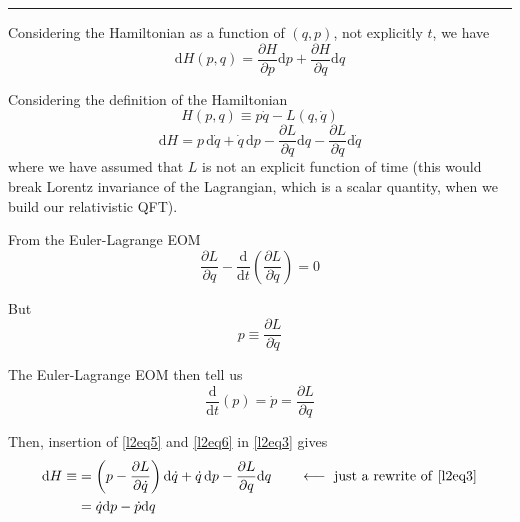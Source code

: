 \documentclass{article}
\begin{document}
\noindent\rule{\textwidth}{.5pt}


\noindent Considering the Hamiltonian as a function of $(q, p)$, not explicitly $t$, we have
\begin{equation}
    \mathrm{d} H (p, q) = \dfrac{ \partial H }{ \partial p } \mathrm{d} p + \dfrac{ \partial H }{ \partial q } \mathrm{d} q \label{l2eq1} %
\end{equation}

\noindent Considering the definition of the Hamiltonian
\begin{equation}
    H (p, q) \equiv p \dot{q} - L (q, \dot{q}) %
\end{equation}
\begin{equation}
    \mathrm{d} H = p \,\mathrm{d} \dot{q} + \dot{q} \,\mathrm{d} p - \dfrac{ \partial L }{ \partial q } \mathrm{d} q - \dfrac{ \partial L }{ \partial \dot{q} } \mathrm{d} \dot{q} \label{l2eq3} %
\end{equation}
where we have assumed that $L$ is not an explicit function of time (this would break Lorentz invariance of the Lagrangian, which is a scalar quantity, when we build our relativistic QFT).

\noindent From the Euler-Lagrange EOM
\begin{equation}
    \dfrac{ \partial L }{ \partial q } - \dfrac{\mathrm{d}}{ \mathrm{d} t } \left( \dfrac{ \partial L }{ \partial \dot{q} } \right) = 0 %
\end{equation}

\noindent But
\begin{equation}
    p \equiv \dfrac{ \partial L }{ \partial \dot{q} } \label{l2eq5} %
\end{equation}

\noindent The Euler-Lagrange EOM then tell us
\begin{equation}
    \dfrac{\mathrm{d}}{ \mathrm{d} t } (p) = \dot{p} = \dfrac{ \partial L }{ \partial q } \label{l2eq6} %
\end{equation}


\noindent Then, insertion of \eqref{l2eq5} and \eqref{l2eq6} in \eqref{l2eq3} gives
\begin{align*}
    \mathrm{d} H \equiv &= \left( p - \dfrac{ \partial L }{ \partial \dot{q} } \right) \mathrm{d} \dot{q} + \dot{q} \,\mathrm{d} p - \dfrac{ \partial L }{ \partial q } \mathrm{d} q \qquad \longleftarrow ~ \mathrm{just} ~ \mathrm{a} ~ \mathrm{rewrite} ~ \mathrm{of} ~ \eqref{l2eq3} \\
    &= \dot{q} \mathrm{d} p - \dot{p} \mathrm{d} q
\end{align*}
\end{document}
